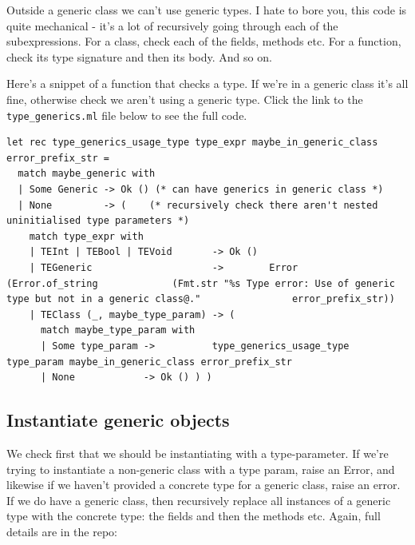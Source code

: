 Outside a generic class we can't use generic types. I hate to bore you,
this code is quite mechanical - it's a lot of recursively going through
each of the subexpressions. For a class, check each of the fields,
methods etc. For a function, check its type signature and then its body.
And so on.

Here's a snippet of a function that checks a type. If we're in a generic
class it's all fine, otherwise check we aren't using a generic type.
Click the link to the \texttt{type\_generics.ml} file below to see the
full code.

%

\begin{lstlisting}[language=caml,caption={type\_generics.ml}]
let rec type_generics_usage_type type_expr maybe_in_generic_class error_prefix_str =
  match maybe_generic with
  | Some Generic -> Ok () (* can have generics in generic class *)
  | None         -> (    (* recursively check there aren't nested uninitialised type parameters *)
    match type_expr with
    | TEInt | TEBool | TEVoid       -> Ok ()
    | TEGeneric                     ->        Error          (Error.of_string             (Fmt.str "%s Type error: Use of generic type but not in a generic class@."                error_prefix_str))
    | TEClass (_, maybe_type_param) -> (
      match maybe_type_param with
      | Some type_param ->          type_generics_usage_type type_param maybe_in_generic_class error_prefix_str
      | None            -> Ok () ) )
\end{lstlisting}

\hypertarget{instantiate-generic-objects}{%
\subsection{\texorpdfstring{\protect\hyperlink{instantiate-generic-objects}{}Instantiate
generic
objects}{Instantiate generic objects}}\label{instantiate-generic-objects}}

We check first that we should be instantiating with a type-parameter. If
we're trying to instantiate a non-generic class with a type param, raise
an Error, and likewise if we haven't provided a concrete type for a
generic class, raise an error. If we do have a generic class, then
recursively replace all instances of a generic type with the concrete
type: the fields and then the methods etc. Again, full details are in
the repo:


